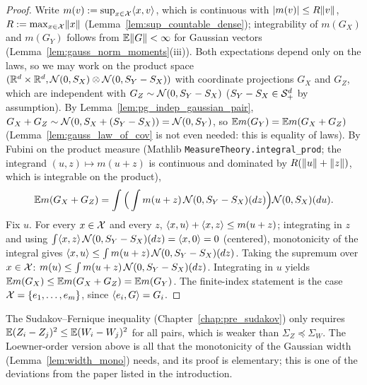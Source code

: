 \begin{proof}
\leanok
{}
Write $m(v) := \sup_{x\in\mathcal{X}}\langle x, v \rangle$, which is continuous with $\lvert m(v) \rvert \le R\lVert v \rVert$,
$R := \max_{x\in\mathcal{X}}\lVert x \rVert$ (Lemma~\ref{lem:sup_countable_dense}); integrability of $m(G_X)$
and $m(G_Y)$ follows from $\mathbb{E}\lVert G \rVert < \infty$ for Gaussian vectors
(Lemma~\ref{lem:gauss_norm_moments}(iii)). Both expectations depend only on the laws, so we may
work on the product space $(\mathbb{R}^d\times\mathbb{R}^d, \mathcal{N}(0,S_X)\otimes\mathcal{N}(0,S_Y-S_X))$ with
coordinate projections $G_X$ and $G_Z$, which are independent with
$G_Z \sim \mathcal{N}(0, S_Y - S_X)$ ($S_Y - S_X \in \mathcal{S}_{+}^{d}$ by assumption). By
Lemma~\ref{lem:pg_indep_gaussian_pair}, $G_X + G_Z \sim \mathcal{N}(0, S_X + (S_Y - S_X)) =
\mathcal{N}(0,S_Y)$, so $\mathbb{E} m(G_Y) = \mathbb{E} m(G_X + G_Z)$ (Lemma~\ref{lem:gauss_law_of_cov} is not
even needed: this is equality of laws). By Fubini on the product measure
(Mathlib \texttt{MeasureTheory.integral\_prod}; the integrand $(u,z)\mapsto m(u+z)$ is
continuous and dominated by $R(\lVert u \rVert+\lVert z \rVert)$, which is integrable on the product),
\[
  \mathbb{E} m(G_X + G_Z) = \int\Big(\int m(u+z)\,\mathcal{N}(0,S_Y-S_X)(dz)\Big)\mathcal{N}(0,S_X)(du).
\]
Fix $u$. For every $x \in \mathcal{X}$ and every $z$, $\langle x, u \rangle + \langle x, z \rangle \le m(u+z)$; integrating in
$z$ and using $\int\langle x, z \rangle\,\mathcal{N}(0,S_Y-S_X)(dz) = \langle x, 0 \rangle = 0$ (centered), monotonicity
of the integral gives $\langle x, u \rangle \le \int m(u+z)\,\mathcal{N}(0,S_Y-S_X)(dz)$. Taking the supremum
over $x\in\mathcal{X}$: $m(u) \le \int m(u+z)\,\mathcal{N}(0,S_Y-S_X)(dz)$. Integrating in $u$ yields
$\mathbb{E} m(G_X) \le \mathbb{E} m(G_X+G_Z) = \mathbb{E} m(G_Y)$. The finite-index statement is the case
$\mathcal{X} = \{e_1,\dots,e_m\}$, since $\langle e_i, G \rangle = G_i$.
\end{proof}

\begin{remark}\label{rem:pg_comparison_vs_sf}
The Sudakov--Fernique inequality (Chapter~\ref{chap:pre_sudakov}) only requires
$\mathbb{E}(Z_i - Z_j)^2 \le \mathbb{E}(W_i - W_j)^2$ for all pairs, which is weaker than
$\Sigma_Z \preceq \Sigma_W$. The Loewner-order version above is all that the monotonicity of
the Gaussian width (Lemma~\ref{lem:width_mono}) needs, and its proof is elementary; this is
one of the deviations from the paper listed in the introduction.
\end{remark}
